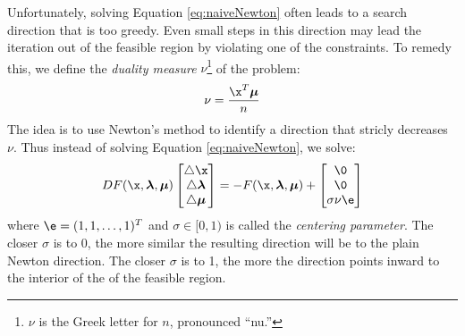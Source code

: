  %

Unfortunately, solving Equation \ref{eq:naiveNewton} often leads to a search direction that is too greedy.
Even small steps in this direction may lead the iteration out of the feasible region by violating one of the constraints.
To remedy this, we define the \emph{duality measure} $\nu$\footnote{$\nu$ is the Greek letter for $n$, pronounced ``nu.''} of the problem: \[\nu = \frac{\x^T\Mu}{n} \]
The idea is to use Newton's method to identify a direction that stricly decreases $\nu$.
Thus instead of solving Equation \ref{eq:naiveNewton}, we solve:
\begin{align}
DF(\x,\Lamb,\Mu)
\begin{bmatrix}\triangle \x\\ \triangle \Lamb\\ \triangle \Mu\end{bmatrix}
= - F(\x,\Lamb,\Mu) +
\begin{bmatrix} \0 \\ \0 \\ \sigma\nu\e \end{bmatrix}
\label{eq:newNewton}
\end{align}
where $\e = (1,1,\ldots,1)^T$ and $\sigma \in [0,1)$ is called the \emph{centering parameter}.
The closer $\sigma$ is to 0, the more similar the resulting direction will be to the plain Newton direction.
The closer $\sigma$ is to 1, the more the direction points inward to the interior of the of the feasible region.

